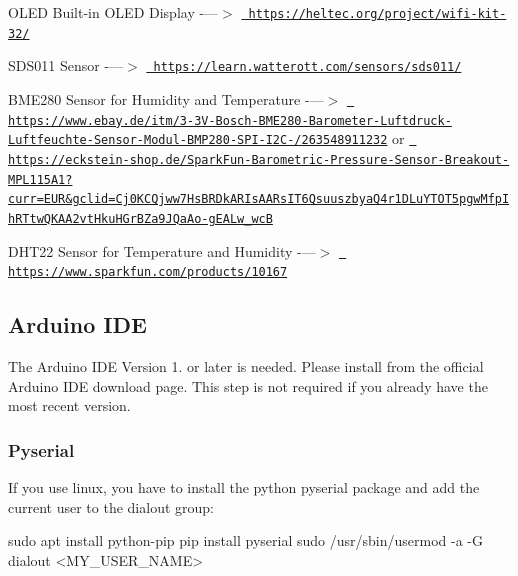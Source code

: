 \begin{DoxyEnumerate}
\item O\+L\+ED Built-\/in O\+L\+ED Display -\/---$>$ \href{https://heltec.org/project/wifi-kit-32/}{\texttt{ https\+://heltec.\+org/project/wifi-\/kit-\/32/}}
\item S\+D\+S011 Sensor -\/---$>$ \href{https://learn.watterott.com/sensors/sds011/}{\texttt{ https\+://learn.\+watterott.\+com/sensors/sds011/}}
\item B\+M\+E280 Sensor for Humidity and Temperature -\/---$>$ \href{https://www.ebay.de/itm/3-3V-Bosch-BME280-Barometer-Luftdruck-Luftfeuchte-Sensor-Modul-BMP280-SPI-I2C-/263548911232}{\texttt{ https\+://www.\+ebay.\+de/itm/3-\/3\+V-\/\+Bosch-\/\+B\+M\+E280-\/\+Barometer-\/\+Luftdruck-\/\+Luftfeuchte-\/\+Sensor-\/\+Modul-\/\+B\+M\+P280-\/\+S\+P\+I-\/\+I2\+C-\//263548911232}} or \href{https://eckstein-shop.de/SparkFun-Barometric-Pressure-Sensor-Breakout-MPL115A1?curr=EUR&gclid=Cj0KCQjww7HsBRDkARIsAARsIT6QsuuszbyaQ4r1DLuYTOT5pgwMfpIhRTtwQKAA2vtHkuHGrBZa9JQaAo-gEALw_wcB}{\texttt{ https\+://eckstein-\/shop.\+de/\+Spark\+Fun-\/\+Barometric-\/\+Pressure-\/\+Sensor-\/\+Breakout-\/\+M\+P\+L115\+A1?curr=\+E\+U\+R\&gclid=\+Cj0\+K\+C\+Qjww7\+Hs\+B\+R\+Dk\+A\+R\+Is\+A\+A\+Rs\+I\+T6\+Qsuuszbya\+Q4r1\+D\+Lu\+Y\+T\+O\+T5pgw\+Mfp\+Ih\+R\+Ttw\+Q\+K\+A\+A2vt\+Hku\+H\+Gr\+B\+Za9\+J\+Qa\+Ao-\/g\+E\+A\+Lw\+\_\+wcB}}
\item D\+H\+T22 Sensor for Temperature and Humidity -\/---$>$ \href{https://www.sparkfun.com/products/10167}{\texttt{ https\+://www.\+sparkfun.\+com/products/10167}}
\end{DoxyEnumerate}\hypertarget{index_arduinoide}{}\subsection{Arduino I\+DE}\label{index_arduinoide}
The Arduino I\+DE Version 1. or later is needed. Please install from the official Arduino I\+DE download page. This step is not required if you already have the most recent version.\hypertarget{index_dialout}{}\subsubsection{Pyserial}\label{index_dialout}
If you use linux, you have to install the python pyserial package and add the current user to the dialout group\+: 
\begin{DoxyPre}{\ttfamily 
 sudo apt install python-pip
 pip install pyserial
 sudo /usr/sbin/usermod -a -G dialout <MY\_USER\_NAME>
 }\end{DoxyPre}

